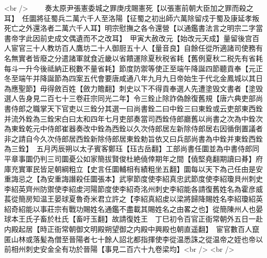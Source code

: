 <br />
　　奏太原尹張憲委城之罪庚戌賜憲死【以張憲前朝大臣加之罪而殺之耳】　任圜將征蜀兵二萬六千人至洛陽【征蜀之初出師六萬除留戍于蜀及康延孝叛死亡之外還洛者二萬六千人耳】明宗慰撫之各令還營【以通鑑書法言之明宗二字當書帝字此因前史成文偶遺而不之改耳】　甲寅大赦改元【始改元天成】量留後宫百人宦官三十人教坊百人鷹坊二十人御厨五十人【量音良】自餘任從所適諸司使務有名無實者皆廢之分遣諸軍就食近畿以省饋運除夏秋税省耗【舊例夏秋二税先有省耗每斗一升今後祗納正税數不量省耗】節度防禦等使正至端午降誕四節聽貢奉【元正冬至端午并降誕節為四案五代會要唐咸通八年九月九日帝始生于代北金鳳城以其日為應聖節】毋得斂百姓【斂力贍翻】刺史以下不得貢奉選人先遭塗毁文書者【塗毁選人告身見二百七十三卷莊宗同光二年】令三銓止除詐偽餘復舊規【唐六典吏部尚書侍郎之職掌天下官吏以三銓分其選一曰尚書銓二曰中銓三曰東銓或云吏部東西銓并流外銓為三銓宋白曰太和四年七月吏部奏當司西銓侍郎廳舊以尚書之次為中銓次為東銓乾元中侍郎崔器奏改中銓為西銓以久次侍郎居左新除侍郎居右因循倒置議者非之請自今久次侍郎居西銓新除侍郎居東銓勅旨依又曰兵部尚書為中銓并東銓西銓為三銓】　五月丙辰朔以太子賓客鄭珏【珏古岳翻】工部尚書任圜並為中書侍郎同平章事圜仍判三司圜憂公如家簡拔賢俊杜絶僥倖期年之間【僥堅堯翻期讀曰朞】府庫充實軍民皆足朝綱粗立【史言任圜輔相有績粗坐五翻】圜每以天下為己任由是安重誨忌之【為安重誨譖殺任圜張本】武寧節度使李紹真忠武節度使李紹瓊貝州刺史李紹英齊州防禦使李紹䖍河陽節度使李紹奇洺州刺史李紹能各請復舊姓名為霍彦威萇從簡房知温王晏球夏魯奇米君立許之【李紹真紹䖍以梁將歸降賜姓名李紹瓊紹英紹奇紹能以事莊宗有戰功賜姓名通鑑不盡載其賜姓名之由畧之也】從簡陳州人也晏球本王氏子畜於杜氏【畜吁玉翻】故請復姓王　丁巳初令百官正衙常朝外五日一赴内殿起居【時正衙常朝御文明殿朔望御之内殿中興殿也朝直遥翻】　宦官數百人竄匿山林或落髪為僧至晉陽者七十餘人詔北都指揮使李從温悉誅之從温帝之姪也帝以前相州刺史安金全有功於晉陽【事見二百六十九卷梁均】<br />
<br />
